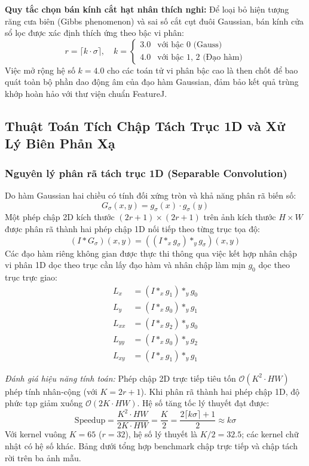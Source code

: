 \documentclass[conference]{IEEEtran}
\begin{document}
\textbf{Quy tắc chọn bán kính cắt hạt nhân thích nghi:} Để loại bỏ hiện tượng răng cưa biên (Gibbs phenomenon) và sai số cắt cụt đuôi Gaussian, bán kính cửa sổ lọc được xác định thích ứng theo bậc vi phân:
\begin{equation}
r = \lceil k \cdot \sigma \rceil, \quad k = \begin{cases} 3.0 & \text{với bậc 0 (Gauss)} \\ 4.0 & \text{với bậc 1, 2 (Đạo hàm)} \end{cases}
\end{equation}
Việc mở rộng hệ số $k=4.0$ cho các toán tử vi phân bậc cao là then chốt để bao quát toàn bộ phần dao động âm của đạo hàm Gaussian, đảm bảo kết quả trùng khớp hoàn hảo với thư viện chuẩn FeatureJ.

\subsection{Thuật Toán Tích Chập Tách Trục 1D và Xử Lý Biên Phản Xạ}
\subsubsection{Nguyên lý phân rã tách trục 1D (Separable Convolution)}
Do hàm Gaussian hai chiều có tính đối xứng tròn và khả năng phân rã biến số:
\begin{equation}
G_\sigma(x, y) = g_\sigma(x) \cdot g_\sigma(y)
\end{equation}
Một phép chập 2D kích thước $(2r+1) \times (2r+1)$ trên ảnh kích thước $H \times W$ được phân rã thành hai phép chập 1D nối tiếp theo từng trục tọa độ:
\begin{equation}
(I * G_\sigma)(x, y) = \left( (I *_x g_\sigma) *_y g_\sigma \right)(x, y)
\end{equation}
Các đạo hàm riêng không gian được thực thi thông qua việc kết hợp nhân chập vi phân 1D dọc theo trục cần lấy đạo hàm và nhân chập làm mịn $g_0$ dọc theo trục trực giao:
\begin{align}
L_x &= (I *_x g_1) *_y g_0 \label{eq:lx} \\
L_y &= (I *_x g_0) *_y g_1 \label{eq:ly} \\
L_{xx} &= (I *_x g_2) *_y g_0 \label{eq:lxx} \\
L_{yy} &= (I *_x g_0) *_y g_2 \label{eq:lyy} \\
L_{xy} &= (I *_x g_1) *_y g_1 \label{eq:lxy}
\end{align}

\textit{Đánh giá hiệu năng tính toán:} Phép chập 2D trực tiếp tiêu tốn $\mathcal{O}(K^2 \cdot HW)$ phép tính nhân-cộng (với $K = 2r+1$). Khi phân rã thành hai phép chập 1D, độ phức tạp giảm xuống $\mathcal{O}(2K \cdot HW)$. Hệ số tăng tốc lý thuyết đạt được:
\begin{equation}
\text{Speedup} = \frac{K^2 \cdot HW}{2K \cdot HW} = \frac{K}{2} = \frac{2\lceil k\sigma \rceil + 1}{2} \approx k\sigma
\end{equation}
Với kernel vuông $K=65$ ($r=32$), hệ số lý thuyết là $K/2=32.5$; các kernel chữ nhật có hệ số khác. Bảng dưới tổng hợp benchmark chập trực tiếp và chập tách rời trên ba ảnh mẫu.
\end{document}
